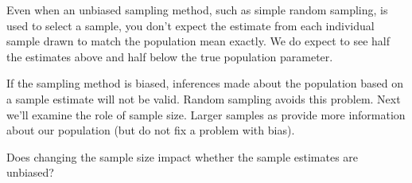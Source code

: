        Even when an unbiased sampling method, such as simple random
       sampling, is used to select a sample, you don't expect the
       estimate from each individual sample drawn to match the
       population mean exactly. We do expect to see half the estimates
       above and half below the true population parameter.

       If the sampling method is biased, inferences made about the
       population based on a sample estimate will not be valid. Random
       sampling avoids this problem.   Next we'll examine the role of
        sample size.  Larger samples as provide more
        information about our population (but do not fix a problem
        with bias).

        \begin{center}
         {\large \sf Does changing the sample size impact whether the
           sample estimates are unbiased?} 
       \end{center}
     

